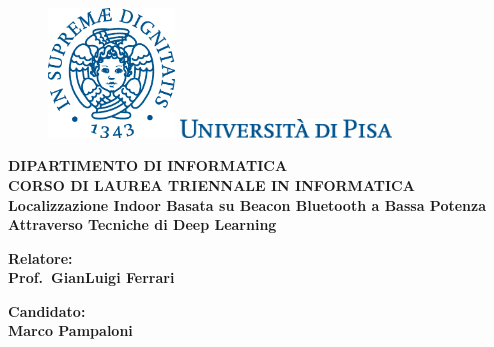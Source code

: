 \documentclass[12pt, twoside, openright]{report}
\begin{document}
\begin{titlepage}
  \begin{figure}[t]
    \centering\includegraphics[width=0.3\textwidth]{./img/cherubino.eps}

    \vspace{0.5cm}
    \centering\includegraphics[width=0.5\textwidth]{./img/logo.eps}
  \end{figure}

  \begin{center}
    \textbf{ DIPARTIMENTO DI INFORMATICA\\ CORSO DI LAUREA TRIENNALE IN INFORMATICA\\}
    \vspace{15mm}
    {\LARGE{\bf Localizzazione Indoor Basata su Beacon Bluetooth a Bassa Potenza
        Attraverso Tecniche di Deep Learning}}\\
  \end{center}

  \vspace{20mm}

  \begin{minipage}[t]{0.47\textwidth}
    {\large{\bf Relatore:\\ Prof.\ GianLuigi Ferrari 
      }}
  \end{minipage}\hfill
  \begin{minipage}[t]{0.47\textwidth}\raggedleft
    {\large{\bf Candidato: \\ Marco Pampaloni}}
  \end{minipage}

  \vfill



\end{titlepage}
\end{document}
